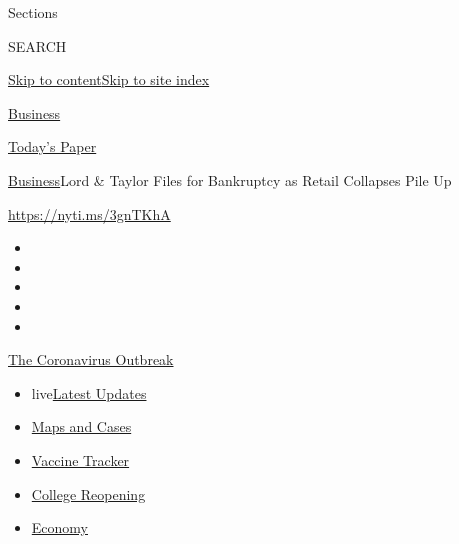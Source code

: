 Sections

SEARCH

\protect\hyperlink{site-content}{Skip to
content}\protect\hyperlink{site-index}{Skip to site index}

\href{https://www.nytimes3xbfgragh.onion/section/business}{Business}

\href{https://myaccount.nytimes3xbfgragh.onion/auth/login?response_type=cookie\&client_id=vi}{}

\href{https://www.nytimes3xbfgragh.onion/section/todayspaper}{Today's
Paper}

\href{/section/business}{Business}\textbar{}Lord \& Taylor Files for
Bankruptcy as Retail Collapses Pile Up

\href{https://nyti.ms/3gnTKhA}{https://nyti.ms/3gnTKhA}

\begin{itemize}
\item
\item
\item
\item
\item
\end{itemize}

\href{https://www.nytimes3xbfgragh.onion/news-event/coronavirus?action=click\&pgtype=Article\&state=default\&region=TOP_BANNER\&context=storylines_menu}{The
Coronavirus Outbreak}

\begin{itemize}
\tightlist
\item
  live\href{https://www.nytimes3xbfgragh.onion/2020/08/03/world/coronavirus-covid-19.html?action=click\&pgtype=Article\&state=default\&region=TOP_BANNER\&context=storylines_menu}{Latest
  Updates}
\item
  \href{https://www.nytimes3xbfgragh.onion/interactive/2020/us/coronavirus-us-cases.html?action=click\&pgtype=Article\&state=default\&region=TOP_BANNER\&context=storylines_menu}{Maps
  and Cases}
\item
  \href{https://www.nytimes3xbfgragh.onion/interactive/2020/science/coronavirus-vaccine-tracker.html?action=click\&pgtype=Article\&state=default\&region=TOP_BANNER\&context=storylines_menu}{Vaccine
  Tracker}
\item
  \href{https://www.nytimes3xbfgragh.onion/2020/08/02/us/covid-college-reopening.html?action=click\&pgtype=Article\&state=default\&region=TOP_BANNER\&context=storylines_menu}{College
  Reopening}
\item
  \href{https://www.nytimes3xbfgragh.onion/live/2020/08/03/business/stock-market-today-coronavirus?action=click\&pgtype=Article\&state=default\&region=TOP_BANNER\&context=storylines_menu}{Economy}
\end{itemize}

